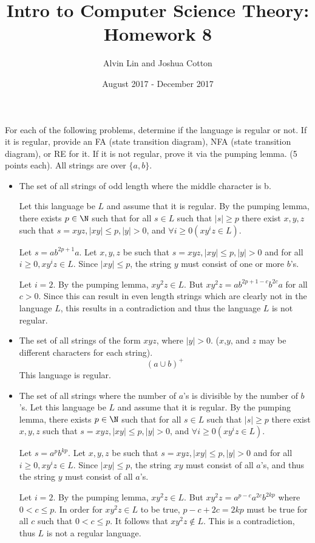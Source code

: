 \documentclass{math}
\title{Intro to Computer Science Theory: Homework 8}
\author{Alvin Lin and Joshua Cotton}
\date{August 2017 - December 2017}
\begin{document}
\maketitle

For each of the following problems, determine if the language is regular or
not. If it is regular, provide an FA (state transition diagram), NFA (state
transition diagram), or RE for it. If it is not regular, prove it via the
pumping lemma. (5 points each). All strings are over \( \{a,b\} \).
\begin{itemize}
  \item The set of all strings of odd length where the middle character is b.
  \par
  Let this language be \( L \) and assume that it is regular. By the pumping
  lemma, there exists \( p\in\N \) such that for all \( s\in L \) such that
  \( |s|\ge p \) there exist \( x,y,z \) such that \( s = xyz, |xy|\le p, |y|>0
  \), and \( \forall{i}\ge0(xy^iz\in L) \). \par
  Let \( s = ab^{2p+1}a \). Let \( x,y,z \) be such that
  \( s = xyz, |xy|\le p, |y|>0 \) and for all \( i\ge0, xy^iz\in L \). Since
  \( |xy|\le p \), the string \( y \) must consist of one or more \( b \)'s.
  \par
  Let \( i = 2 \). By the pumping lemma, \( xy^2z\in L \). But \( xy^2z =
  ab^{2p+1-c}b^{2c}a \) for all \( c>0 \). Since this can result in even length
  strings which are clearly not in the language \( L \), this results in a
  contradiction and thus the language \( L \) is not regular.

  \item The set of all strings of the form \( xyz \), where \( |y|>0 \).
  (\( x \),\( y \), and \( z \) may be different characters for each string).
  \[ (a\cup b)^+ \]
  This language is regular.

  \item The set of all strings where the number of \( a \)'s is divisible by
  the number of \( b \)'s.
  Let this language be \( L \) and assume that it is regular. By the pumping
  lemma, there exists \( p\in\N \) such that for all \( s\in L \) such that
  \( |s|\ge p \) there exist \( x,y,z \) such that \( s = xyz, |xy|\le p, |y|>0
  \), and \( \forall{i}\ge0(xy^iz\in L) \). \par
  Let \( s = a^pb^{kp} \). Let \( x,y,z \) be such that
  \( s = xyz, |xy|\le p, |y|>0 \) and for all \( i\ge0, xy^iz\in L \). Since
  \( |xy|\le p \), the string \( xy \) must consist of all \( a \)'s, and thus
  the string \( y \) must consist of all \( a \)'s.
  \par
  Let \( i = 2 \). By the pumping lemma, \( xy^2z\in L \). But \( xy^2z =
  a^{p-c}a^{2c}b^{2kp} \) where \( 0<c\le p \). In order for \( xy^2z\in L \) to
  be true, \( p-c+2c = 2kp \) must be true for all \( c \) such that
  \( 0<c\le p \). It follows that \( xy^2z\notin L \). This is a contradiction,
  thus \( L \) is not a regular language.


\end{itemize}
\end{document}
